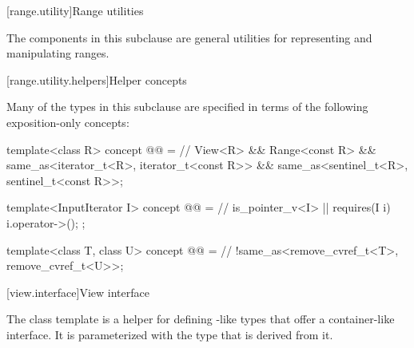 [range.utility]{Range utilities}

\pnum
The components in this subclause are general utilities for representing and
manipulating ranges.

[range.utility.helpers]{Helper concepts}

\pnum
Many of the types in this subclause are specified in terms of
the following exposition-only concepts:

\begin{codeblock}
template<class R>
  concept @@ =                         // \expos
    View<R> && Range<const R> &&
    same_as<iterator_t<R>, iterator_t<const R>> &&
    same_as<sentinel_t<R>, sentinel_t<const R>>;

template<InputIterator I>
  concept @@ =                           // \expos
    is_pointer_v<I> || requires(I i) { i.operator->(); };

template<class T, class U>
  concept @@ =                         // \expos
    !same_as<remove_cvref_t<T>, remove_cvref_t<U>>;
\end{codeblock}

[view.interface]{View interface}

\pnum
The class template  is a helper for defining
-like types that offer a container-like interface. It is
parameterized with the type that is derived from it.

